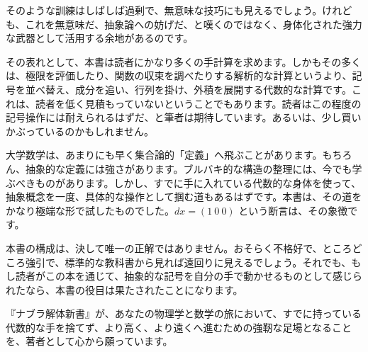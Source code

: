 \documentclass[a4paper,12pt,openany]{book}
\begin{document}
そのような訓練はしばしば過剰で、無意味な技巧にも見えるでしょう。けれども、これを無意味だ、抽象論への妨げだ、と嘆くのではなく、身体化された強力な武器として活用する余地があるのです。

その表れとして、本書は読者にかなり多くの手計算を求めます。しかもその多くは、極限を評価したり、関数の収束を調べたりする解析的な計算というより、記号を並べ替え、成分を追い、行列を掛け、外積を展開する代数的な計算です。これは、読者を低く見積もっていないということでもあります。読者はこの程度の記号操作には耐えられるはずだ、と筆者は期待しています。あるいは、少し買いかぶっているのかもしれません。

大学数学は、あまりにも早く集合論的「定義」へ飛ぶことがあります。もちろん、抽象的な定義には強さがあります。ブルバキ的な構造の整理には、今でも学ぶべきものがあります。しかし、すでに手に入れている代数的な身体を使って、抽象概念を一度、具体的な操作として掴む道もあるはずです。本書は、その道をかなり極端な形で試したものでした。\(dx=(1\ 0\ 0)\)
という断言は、その象徴です。

本書の構成は、決して唯一の正解ではありません。おそらく不格好で、ところどころ強引で、標準的な教科書から見れば遠回りに見えるでしょう。それでも、もし読者がこの本を通じて、抽象的な記号を自分の手で動かせるものとして感じられたなら、本書の役目は果たされたことになります。

『ナブラ解体新書』が、あなたの物理学と数学の旅において、すでに持っている代数的な手を捨てず、より高く、より遠くへ進むための強靭な足場となることを、著者として心から願っています。
\end{document}
